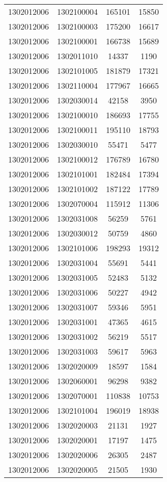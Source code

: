 \begin{longtable}{llcc}
1302012006 & 1302100004 & 165101 & 15850\\
1302012006 & 1302100003 & 175200 & 16617\\
1302012006 & 1302100001 & 166738 & 15689\\
1302012006 & 1302011010 & 14337 & 1190\\
1302012006 & 1302101005 & 181879 & 17321\\
1302012006 & 1302110004 & 177967 & 16665\\
1302012006 & 1302030014 & 42158 & 3950\\
1302012006 & 1302100010 & 186693 & 17755\\
1302012006 & 1302100011 & 195110 & 18793\\
1302012006 & 1302030010 & 55471 & 5477\\
1302012006 & 1302100012 & 176789 & 16780\\
1302012006 & 1302101001 & 182484 & 17394\\
1302012006 & 1302101002 & 187122 & 17789\\
1302012006 & 1302070004 & 115912 & 11306\\
1302012006 & 1302031008 & 56259 & 5761\\
1302012006 & 1302030012 & 50759 & 4860\\
1302012006 & 1302101006 & 198293 & 19312\\
1302012006 & 1302031004 & 55691 & 5441\\
1302012006 & 1302031005 & 52483 & 5132\\
1302012006 & 1302031006 & 50227 & 4942\\
1302012006 & 1302031007 & 59346 & 5951\\
1302012006 & 1302031001 & 47365 & 4615\\
1302012006 & 1302031002 & 56219 & 5517\\
1302012006 & 1302031003 & 59617 & 5963\\
1302012006 & 1302020009 & 18597 & 1584\\
1302012006 & 1302060001 & 96298 & 9382\\
1302012006 & 1302070001 & 110838 & 10753\\
1302012006 & 1302101004 & 196019 & 18938\\
1302012006 & 1302020003 & 21131 & 1927\\
1302012006 & 1302020001 & 17197 & 1475\\
1302012006 & 1302020006 & 26305 & 2487\\
1302012006 & 1302020005 & 21505 & 1930\\

\end{longtable}
